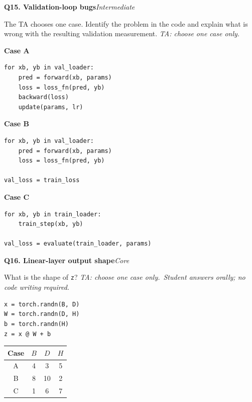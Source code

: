\documentclass[11pt]{article}
\newif\ifshowanswers
\newenvironment{question}[3]{%
  \par\medskip
  \noindent\textbf{Q#1. #2}\hfill\textit{#3}\par\smallskip
}{\par\medskip}
\newcommand{\answer}[1]{%
  \ifshowanswers
    \begin{quote}\small\textbf{Expected answer:} #1\end{quote}
  \fi
}
\newcommand{\marking}[1]{%
  \ifshowanswers
    \begin{quote}\small\textbf{1 mark:} #1\end{quote}
  \fi
}
\newcommand{\casesnote}{\textit{TA: choose one case only.}}
\newcommand{\oralnote}{\textit{Student answers orally; no code writing required.}}
\begin{document}
\begin{question}{15}{Validation-loop bugs}{Intermediate}
The TA chooses one case. Identify the problem in the code and explain what is
wrong with the resulting validation measurement. \casesnote

\textbf{Case A}
\begin{verbatim}
for xb, yb in val_loader:
    pred = forward(xb, params)
    loss = loss_fn(pred, yb)
    backward(loss)
    update(params, lr)
\end{verbatim}

\textbf{Case B}
\begin{verbatim}
for xb, yb in val_loader:
    pred = forward(xb, params)
    loss = loss_fn(pred, yb)

val_loss = train_loss
\end{verbatim}

\textbf{Case C}
\begin{verbatim}
for xb, yb in train_loader:
    train_step(xb, yb)

val_loss = evaluate(train_loader, params)
\end{verbatim}

\answer{
Case A: The model is being updated using validation samples. Validation data
must only be used for evaluation, not parameter updates. This leaks validation
information into training.

Case B: The validation predictions may be computed, but the reported
\texttt{val\_loss} is actually the training loss. The validation losses must be
accumulated/averaged separately.

Case C: The so-called validation loss is being evaluated on the training
loader. It therefore measures training performance, not generalization to the
validation set.
}

\marking{Student identifies the error in the chosen case and explains why the
reported validation performance is invalid or misleading.}
\end{question}

\begin{question}{16}{Linear-layer output shape}{Core}
What is the shape of \texttt{z}? \casesnote \ \oralnote

\begin{lstlisting}
x = torch.randn(B, D)
W = torch.randn(D, H)
b = torch.randn(H)
z = x @ W + b
\end{lstlisting}

\begin{center}
\begin{tabular}{cccc}
\toprule
Case & $B$ & $D$ & $H$ \\
\midrule
A & 4 & 3 & 5 \\
B & 8 & 10 & 2 \\
C & 1 & 6 & 7 \\
\bottomrule
\end{tabular}
\end{center}

\answer{The shape is always $(B,H)$. A: $(4,5)$. B: $(8,2)$. C: $(1,7)$.}
\marking{Correct output shape for the chosen case.}
\end{question}
\end{document}
